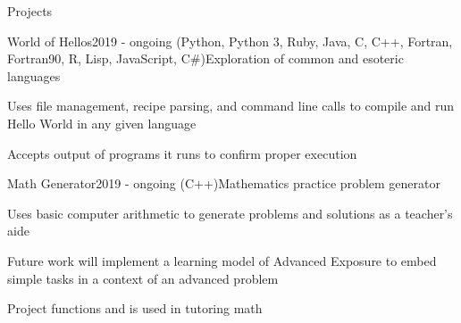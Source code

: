 \documentclass{resume} %
\begin{document}

\begin{rSection}{Projects} \vspace{-0.25em}


\begin{rWorkSubsection}{World of Hellos}{2019 - ongoing (Python, Python 3, Ruby, Java, C, C++, Fortran, Fortran90, R, Lisp, JavaScript, C\#)}{Exploration of common and esoteric languages}{}
\item Uses file management, recipe parsing, and command line calls to compile and run Hello World in any given language
\item Accepts output of programs it runs to confirm proper execution
\end{rWorkSubsection}\vspace{-0.5em}

\iffalse
\begin{rWorkSubsection}{j-elliot.github.io}{2019 - ongoing (HTML, CSS)}{Personal Website}{}
\item Showcases projects and Curiculum Vitea information as well as personal philosophy
\item Includes a sexy calendar
\end{rWorkSubsection}\vspace{-0.5em}
\fi

\begin{rWorkSubsection}{Math Generator}{2019 - ongoing (C++)}{Mathematics practice problem generator}{}
\item Uses basic computer arithmetic to generate problems and solutions as a teacher's aide
\item Future work will implement a learning model of Advanced Exposure to embed simple tasks in a context of an advanced problem
\item Project functions and is used in tutoring math
\end{rWorkSubsection}\vspace{-0.5em}


\end{rSection}
\end{document}
